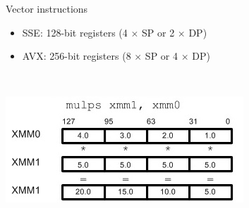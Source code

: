 \documentclass[sans,mathserif]{beamer}
\begin{document}
\begin{frame}{Vector instructions}
  \begin{itemize}
  \item SSE: 128-bit registers (4 $\times$ SP or 2 $\times$ DP)
  \item AVX: 256-bit registers (8 $\times$ SP or 4 $\times$ DP)
  \end{itemize}

~

\includegraphics[width=.6\textwidth]{sse.jpg} 
\end{frame}
\end{document}
